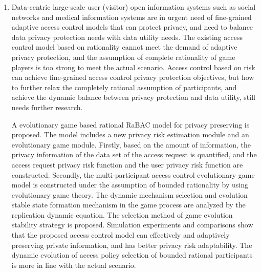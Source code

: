 \documentclass[pdftex,notypeinfo,twoside,openany,UTF8,fntef]{CASthesis}
\theoremstyle{THrm}{
	\newtheorem{question}{Question}[section]
	\newtheorem{property}{性质}[section]
	\newtheorem{assumption}{假设}[section]
	\newtheorem{claim}[lemma]{断言}
	
}
\begin{document}
\begin{enumerate}
	\item
	Data-centric large-scale user (visitor) open information systems such as social networks and medical information systems are in urgent need of fine-grained adaptive access control models that can protect privacy, and need to balance data privacy protection needs with data utility needs. The existing access control model based on rationality cannot meet the demand of adaptive privacy protection, and the assumption of complete rationality of game players is too strong to meet the actual scenario. Access control based on risk can achieve fine-grained access control privacy protection objectives, but how to further relax the completely rational assumption of participants, and achieve the dynamic balance between privacy protection and data utility, still needs further research.
	 
	A evolutionary game based rational RaBAC model for privacy preserving is proposed. The model includes a new privacy risk estimation module and an evolutionary game module. Firstly, based on the amount of information, the privacy information of the data set of the access request is quantified, and the access request privacy risk function and the user privacy risk function are constructed. Secondly, the multi-participant access control evolutionary game model is constructed under the assumption of bounded rationality by using evolutionary game theory. The dynamic mechanism selection and evolution stable state formation mechanism in the game process are analyzed by the replication dynamic equation. The selection method of game evolution stability strategy is proposed. Simulation experiments and comparisons show that the proposed access control model can effectively and adaptively preserving private information, and has better privacy risk adaptability. The dynamic evolution of access policy selection of bounded rational participants is more in line with the actual scenario.
\end{enumerate}
\end{document}
